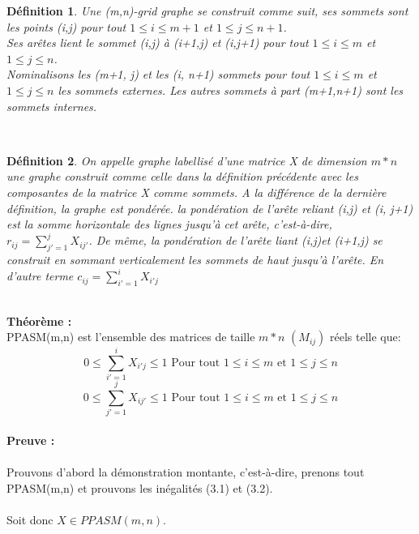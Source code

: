 \documentclass{book}
\newtheorem{petit_nom2}{Définition}[chapter]
\begin{document}
\begin{petit_nom2}
Une (m,n)-grid graphe se construit comme suit, ses sommets sont les points (i,j) pour tout $1 \leqslant i \leqslant m+1$ et $1 \leqslant j \leqslant n+1$. \\ Ses arêtes lient le sommet (i,j) à (i+1,j) et (i,j+1) pour tout $1 \leqslant i \leqslant m$ et $1 \leqslant j \leqslant n$. \\
Nominalisons les (m+1, j) et les (i, n+1) sommets pour tout $1 \leqslant i \leqslant m$ et $1 \leqslant j \leqslant n$ les sommets externes. Les autres sommets à  part (m+1,n+1) sont les sommets internes. \\
\end{petit_nom2}\\
\begin{petit_nom2}
On appelle graphe labellisé d'une matrice X de dimension $m*n$ une graphe construit comme celle dans la définition précédente avec les composantes de la matrice X comme sommets. A la différence de la dernière définition, la graphe est pondérée. la pondération de l'arête reliant (i,j) et (i, j+1) est la somme horizontale des lignes jusqu'à cet arête, c'est-à-dire, $r_{ij}=\sum_{j'=1}^{j}{X_{ij'}}$. De même, la pondération de l'arête liant (i,j)et (i+1,j) se construit en sommant verticalement les sommets de haut jusqu'à l'arête. En d'autre terme $c_{ij}=\sum_{i'=1}^{i}{X_{i'j}}$
\end{petit_nom2}\\
\textbf{Théorème :}\\
PPASM(m,n) est l'ensemble des matrices de taille $m*n$ $(M_{ij})$ réels telle que:\\
\begin{equation}
0 \leqslant \sum_{i'=1}^{i}{X_{i'j}} \leqslant 1   \text{ Pour tout } 1 \leqslant i \leqslant m \text{ et } 1 \leqslant j \leqslant n
\end{equation} 
\begin{equation}
0 \leqslant \sum_{j'=1}^{j}{X_{ij'}} \leqslant 1    \text{ Pour tout } 1 \leqslant i \leqslant m \text{ et } 1 \leqslant j \leqslant n
\end{equation}\\ 
\textbf{Preuve : }\\\\
Prouvons d'abord la démonstration montante, c'est-à-dire, prenons tout PPASM(m,n) et prouvons les inégalités (3.1) et (3.2).\\\\
Soit donc $X \in PPASM(m,n)$.\\\\ 
\end{document}
